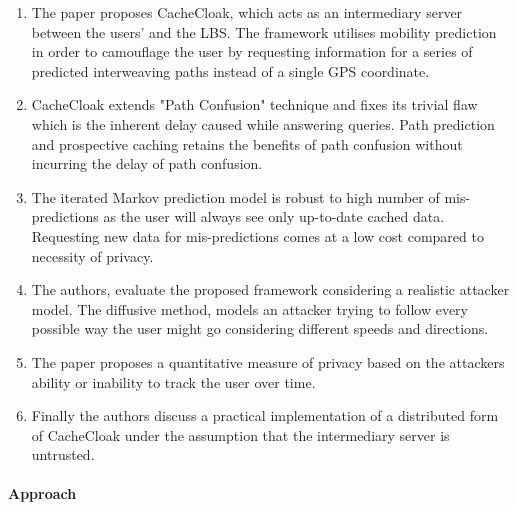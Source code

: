 \begin{enumerate}
	\item The paper proposes CacheCloak, which acts as an intermediary server 
	between the users' and the LBS. The framework utilises mobility prediction in
	order to camouflage the user by requesting information for a series of 
	predicted interweaving paths instead of a single GPS coordinate. 
	
	\item CacheCloak extends "Path Confusion" technique and fixes its trivial 
	flaw which is the inherent delay caused while answering queries. Path 
	prediction and prospective caching retains the benefits of path confusion 
	without incurring the delay of path confusion. 
	
	\item The iterated Markov prediction model is robust to high number of 
	mis-predictions as the user will always see only up-to-date cached data. 
	Requesting new data for mis-predictions comes at a low cost compared to 
	necessity of privacy. 
	
	\item The authors, evaluate the proposed framework considering a realistic
	attacker model. The diffusive method, models an attacker trying to follow
	every possible way the user might go considering different speeds and 
	directions. 
	
	\item The paper proposes a quantitative measure of privacy based on 
	the attackers ability or inability to track the user over time. 
	
	\item Finally the authors discuss a practical implementation of a distributed
	form of CacheCloak under the assumption that the intermediary server is 
	untrusted. 
	
\end{enumerate}


\paragraph{Approach}

